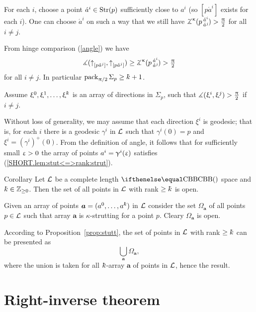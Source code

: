 For each $i$,
choose a point $\acute a^i\in\Str(p)$ sufficiently close to $a^i$ (so $[p\acute a^i]$ exists for each $i$).
One can choose $\acute a^i$ on such a way that we still have
$\angk\kappa{p}{\acute a^i}{\acute a^j}>\tfrac\pi2$ for all $i\not=j$.

From hinge comparison (\ref{angle}) we have 
\[\mangle(\dir{p}{\acute a^j},\dir{p}{\acute a^j})
\ge
\angk\kappa{p}{\acute a^i}{\acute a^j}
>
\tfrac\pi2\]
for all $i\not=j$.
In particular $\pack_{\pi/2}\Sigma_p\ge \kay+1$.

Assume $\xi^0,\xi^1,\dots,\xi^\kay$ is an array of directions in $\Sigma_p$, such that $\measuredangle(\upxi^i,\upxi^j)>\tfrac{\uppi}2$ if $i\not=j$.

Without loss of generality, 
we may assume that each direction $\xi^i$ is geodesic;
that is, for each $i$ there is a geodesic $\gamma^i$ in $\mathcal{L}$ such that $\gamma^i(0)=p$ and $\xi^i=(\gamma^i)^+(0)$.
From the definition of angle, it follows that for sufficiently small $\upvarepsilon>0$ the array of points $a^i=\upgamma^i(\upvarepsilon)$ satisfies (\ref{SHORT.lem:stut<=>rank:strut}).
\qeds

\begin{thm}{Corollary}\label{cor:rank>=k-open}
Let $\mathcal{L}$ be a complete length $\Alex{}$ space and $\kay\in\ZZ_{\ge0}$.
Then the set of all points in $\mathcal{L}$ 
with rank $\ge \kay$ is open.
\end{thm}

 Given an array of points $\bm{a}=(a^0,\dots,a^\kay)$ in $\mathcal{L}$ consider 
the set $\Omega_{\bm{a}}$ of all points $p\in \spc{L}$ such that array $\bm{a}$
 is $\kappa$-strutting for a point $p$.
Cleary $\Omega_{\bm{a}}$ is open.

According to Proposition~\ref{prop:stutt}, the set of points in $\mathcal{L}$ 
with rank $\ge \kay$ can be presented as
\[\bigcup_{\bm{a}}\Omega_{\bm{a}},\]
where the union is taken for all $\kay$-array $\bm{a}$ of points in $\mathcal{L}$,
hence the result.
\qeds





\section{Right-inverse theorem}\label{sec:right-inverse-1}


